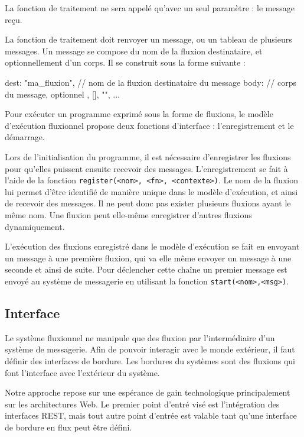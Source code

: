 La fonction de traitement ne sera appelé qu'avec un seul paramètre : le message reçu.

La fonction de traitement doit renvoyer un message, ou un tableau de plusieurs messages.
Un message se compose du nom de la fluxion destinataire, et optionnellement d'un corps.
Il se construit sous la forme suivante :

\begin{code}
{
  dest: "ma_fluxion", // nom de la fluxion destinataire du message
  body: // corps du message, optionnel
      {}, [], "", ...
}
\end{code}

Pour exécuter un programme exprimé sous la forme de fluxions, le modèle d'exécution fluxionnel propose deux fonctions d'interface : l'enregistrement et le démarrage.

Lors de l'initialisation du programme, il est nécessaire d'enregistrer les fluxions pour qu'elles puissent ensuite recevoir des messages.
L'enregistrement se fait à l'aide de la fonction \texttt{register(<nom>, <fn>, <contexte>)}.
Le nom de la fluxion lui permet d'être identifié de manière unique dans le modèle d'exécution, et ainsi de recevoir des messages.
Il ne peut donc pas exister plusieurs fluxions ayant le même nom.
Une fluxion peut elle-même enregistrer d'autres fluxions dynamiquement.

L'exécution des fluxions enregistré dans le modèle d'exécution se fait en envoyant un message à une première fluxion, qui va elle même envoyer un message à une seconde et ainsi de suite.
Pour déclencher cette chaîne un premier message est envoyé au système de messagerie en utilisant la fonction \texttt{start(<nom>,<msg>)}.

\subsection{Interface}

Le système fluxionnel ne manipule que des fluxion par l'intermédiaire d'un système de messagerie.
Afin de pouvoir interagir avec le monde extérieur, il faut définir des interfaces de bordure.
Les bordures du systèmes sont des fluxions qui font l'interface avec l'extérieur du système.

Notre approche repose sur une espérance de gain technologique principalement sur les architectures Web.
Le premier point d'entré visé est l'intégration des interfaces REST, mais tout autre point d'entrée est valable tant qu'une interface de bordure en flux peut être défini.

